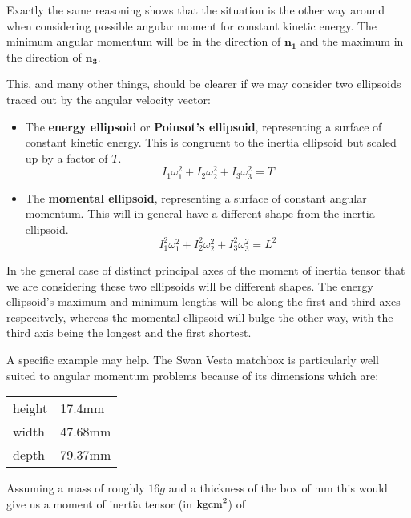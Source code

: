 \documentclass[a4paper, 12pt]{article}
\begin{document}
Exactly the same reasoning shows that the situation is the other way around when considering possible angular moment for constant kinetic energy. The minimum angular momentum will be in the direction of $\bm{n_1}$ and the maximum in the direction of $\bm{n_3}$.

This, and many other things, should be clearer if we may consider two ellipsoids traced out by the angular velocity vector:
\begin{itemize}
\item The {\bf energy ellipsoid} or {\bf Poinsot's ellipsoid}, representing a surface of constant kinetic energy. This is congruent to the inertia ellipsoid but scaled up by a factor of $T$.
  \begin{equation}\label{eq:energy_ellipsoid}
    I_1\omega_1^2 + I_2\omega_2^2 + I_3\omega_3^2 =T
  \end{equation}
\item The {\bf momental ellipsoid}, representing a surface of constant angular momentum. This will in general have a different shape from the inertia ellipsoid.
  \begin{equation}\label{eq:momental_ellipsoid}
    I_1^2\omega_1^2 + I_2^2\omega_2^2 + I_3^2\omega_3^2 = L^2
  \end{equation}
\end{itemize}

In the general case of distinct principal axes of the moment of inertia tensor that we are considering these two ellipsoids will be different shapes. The energy ellipsoid's maximum and minimum lengths will be along the first and third axes respecitvely, whereas the momental ellipsoid will bulge the other way, with the third axis being the longest and the first shortest.

A specific example may help. The Swan Vesta matchbox is particularly well suited to angular momentum problems because of its dimensions which are:

\begin{center}
  \begin{tabular}{l l}
    height & 17.4mm \\
    width & 47.68mm \\
    depth & 79.37mm \\
  \end{tabular}
\end{center}

Assuming a mass of roughly $16g$ and a thickness of the box of mm this would give us a moment of inertia tensor (in $\textup{kgcm}^2$) of
\end{document}
